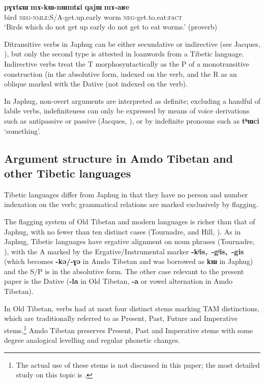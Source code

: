 \documentclass[oneside,a4paper,11pt]{article}
\newcommand{\ipa}[1]{{\phon\textbf{\mbox{#1}}}} %
\begin{document}
\begin{exe}
\ex \label{ex:maRe}
\gll
\ipa{pɣɤtɕɯ}  	\ipa{mɤ-kɯ-nɯmtɕi}  	\ipa{qajɯ}  	\ipa{mɤ-aʁe}  \\
bird \textsc{neg-nmlz}:S/A-get.up.early worm \textsc{neg}-get.to.eat:\textsc{fact} \\
\glt `Birds which do not get up early do not get to eat worms.' (proverb) 
\end{exe}  

Ditransitive verbs in Japhug can be either secundative or indirective (see Jacques, \citeyear{jacques14antipassive}), but only the second type is attested in loanwords from a Tibetic language. Indirective verbs treat the T morphosyntactically as the P of a monotransitive construction (in the absolutive form, indexed on the verb, and the R as an oblique marked with the Dative (not indexed on the verb).

In Japhug, non-overt arguments are interpreted as definite; excluding a handful of labile verbs, indefiniteness can only be expressed by means of voice derivations such as antipassive or passive (Jacques, \citeyear{jacques12demotion}), or by indefinite pronouns such as \ipa{tʰɯci} `something'.

\subsection{Argument structure in Amdo Tibetan and other Tibetic languages}
Tibetic languages differ from Japhug in that they have no person and number indexation on the verb; grammatical relations are marked exclusively by flagging.

The flagging system of Old Tibetan and modern languages is richer than that of Japhug,  with no fewer than ten distinct cases (Tournadre, \citeyear{tournadre10cases} and  Hill, \citeyear{hill12bas}). As in Japhug, Tibetic languages have ergative alignment on noun phrases (Tournadre, \citeyear{tournadre96erg}), with the A marked by the Ergative/Instrumental marker \ipa{-kʲis, -gʲis, -gis} (which becomes \ipa{-kə/-ɣə} in Amdo Tibetan and was borrowed as \ipa{kɯ} in Japhug) and the S/P is in the absolutive form. The other case relevant to the present paper is the Dative (\ipa{-la} in Old Tibetan, \ipa{-a} or vowel alternation in Amdo Tibetan).


In Old Tibetan, verbs had at most four distinct stems marking TAM distinctions, which are traditionally referred to as Present, Past, Future and Imperative stems.\footnote{The actual use of these stems is not discussed in this paper; the most detailed study on this topic is \citet{zeisler04}.} Amdo Tibetan preserves Present, Past and Imperative stems with some degree analogical levelling and regular phonetic changes.
\end{document}
